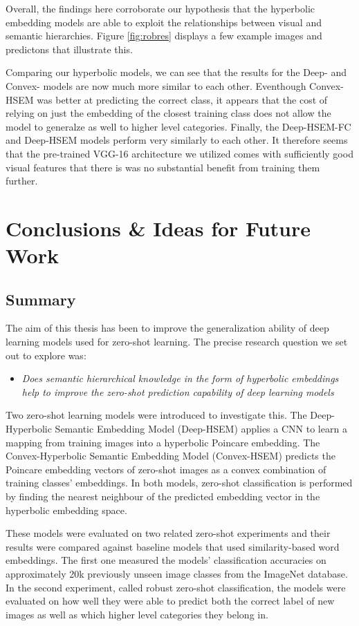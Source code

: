 \documentclass[12pt]{report}
\begin{document}
Overall, the findings here corroborate our hypothesis that the hyperbolic embedding models are able to exploit the relationships between visual and semantic hierarchies. Figure \ref{fig:robres} displays a few example images and predictons that illustrate this.

Comparing our hyperbolic models, we can see that the results for the Deep- and Convex- models are now much more similar to each other. Eventhough Convex-HSEM was better at predicting the correct class, it appears that the cost of relying on just the embedding of the closest training class does not allow the model to generalze as well to higher level categories. Finally, the Deep-HSEM-FC and Deep-HSEM models perform very similarly to each other. It therefore seems that the pre-trained VGG-16 architecture we utilized comes with sufficiently good visual features that there is was no substantial benefit from training them further.

\newpage
\chapter{Conclusions \& Ideas for Future Work}

\section{Summary}
The aim of this thesis has been to improve the generalization ability of deep learning models used for zero-shot learning. The precise research question we set out to explore was: 
\begin{itemize}
\item \textit{Does semantic hierarchical knowledge in the form of hyperbolic embeddings help to improve the zero-shot prediction capability of deep learning models}
\end{itemize}
Two zero-shot learning models were introduced to investigate this. The Deep-Hyperbolic Semantic Embedding Model (Deep-HSEM) applies a CNN to learn a mapping from training images into a hyperbolic Poincare embedding. The Convex-Hyperbolic Semantic Embedding Model (Convex-HSEM) predicts the Poincare embedding vectors of zero-shot images as a convex combination of training classes' embeddings. In both models, zero-shot classification is performed by finding the nearest neighbour of the predicted embedding vector in the hyperbolic embedding space.

These models were evaluated on two related zero-shot experiments and their results were compared against baseline models that used similarity-based word embeddings. The first one measured the models' classification accuracies on approximately 20k previously unseen image classes from the ImageNet database. In the second experiment, called robust zero-shot classification, the models were evaluated on how well they were able to predict both the correct label of new images as well as which higher level categories they belong in.
\end{document}
